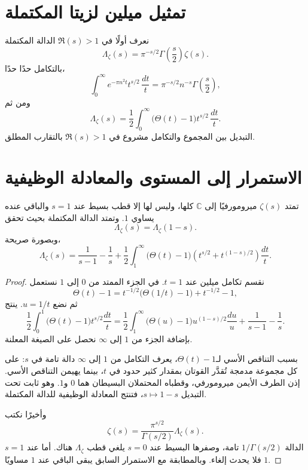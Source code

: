 \section{تمثيل ميلين لزيتا المكتملة}

نعرف أولًا في \(\Re(s)>1\) الدالة المكتملة
\[
\Lambda_\zeta(s)
=
\pi^{-s/2}\Gamma\!\left(\frac{s}{2}\right)\zeta(s).
\]
بالتكامل حدًا حدًا،
\[
\int_0^\infty e^{-\pi n^2t}t^{s/2}\,\frac{dt}{t}
=
\pi^{-s/2}n^{-s}\Gamma\!\left(\frac{s}{2}\right),
\]
ومن ثم
\[
\Lambda_\zeta(s)
=
\frac12
\int_0^\infty
\bigl(\Theta(t)-1\bigr)t^{s/2}\,\frac{dt}{t}.
\]
التبديل بين المجموع والتكامل مشروع في \(\Re(s)>1\) بالتقارب المطلق.

\section{الاستمرار إلى المستوى والمعادلة الوظيفية}

\begin{theorem}
\label{thm:zeta-global-continuation-functional-equation}
\provedhere
تمتد \(\zeta(s)\) ميرومورفيًا إلى \(\mathbb{C}\) كلها، وليس لها إلا
قطب بسيط عند \(s=1\) والباقي عنده يساوي \(1\). وتمتد الدالة المكتملة بحيث تحقق
\[
\Lambda_\zeta(s)=\Lambda_\zeta(1-s).
\]
وبصورة صريحة،
\[
\Lambda_\zeta(s)
=
\frac{1}{s-1}-\frac1s
+
\frac12\int_1^\infty
\bigl(\Theta(t)-1\bigr)
\left(t^{s/2}+t^{(1-s)/2}\right)
\frac{dt}{t}.
\]
\end{theorem}

\begin{proof}
نقسم تكامل ميلين عند \(t=1\). في الجزء الممتد من \(0\) إلى \(1\)
نستعمل
\[
\Theta(t)-1
=
t^{-1/2}\bigl(\Theta(1/t)-1\bigr)
+
t^{-1/2}-1,
\]
ثم نضع \(u=1/t\). ينتج
\[
\frac12\int_0^1
\bigl(\Theta(t)-1\bigr)t^{s/2}\frac{dt}{t}
=
\frac12\int_1^\infty
\bigl(\Theta(u)-1\bigr)u^{(1-s)/2}\frac{du}{u}
+
\frac{1}{s-1}-\frac1s.
\]
بإضافة الجزء من \(1\) إلى \(\infty\) نحصل على الصيغة المعلنة.

بسبب التناقص الأسي لـ\(\Theta(t)-1\)، يعرف التكامل من \(1\) إلى
\(\infty\) دالة تامة في \(s\): على كل مجموعة مدمجة تُقدَّر القوتان
بمقدار كثير حدود في \(t\)، بينما يهيمن التناقص الأسي. إذن الطرف الأيمن
ميرومورفي، وقطباه المحتملان البسيطان هما \(0\) و\(1\). وهو ثابت تحت
التبديل \(s\mapsto1-s\)، فتنتج المعادلة الوظيفية للدالة المكتملة.

وأخيرًا نكتب
\[
\zeta(s)
=
\frac{\pi^{s/2}}{\Gamma(s/2)}\Lambda_\zeta(s).
\]
الدالة \(1/\Gamma(s/2)\) تامة، وصفرها البسيط عند \(s=0\) يلغي قطب
\(\Lambda_\zeta\) هناك. أما عند \(s=1\) فلا يحدث إلغاء. وبالمطابقة
مع الاستمرار السابق يبقى الباقي عند \(1\) مساويًا \(1\).
\end{proof}

